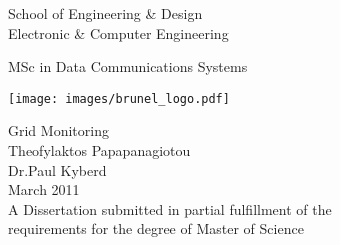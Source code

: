 
\thispagestyle{empty}

\begin{center}
\Large
School of Engineering \& Design\\
Electronic \& Computer Engineering\\
\vspace{1\baselineskip}

MSc in Data Communications Systems\\
\vspace{1\baselineskip}

\begin{center}
\texttt{[image: images/brunel\_logo.pdf]}\\
\end{center}
\vspace{0.5\baselineskip}

\Huge
Grid Monitoring\\
\vspace{1.5\baselineskip}
\Huge
Theofylaktos Papapanagiotou\\
Dr.Paul Kyberd\\
\vspace{1\baselineskip}
\large
March 2011\\
\vspace{0.5\baselineskip}
\large
A Dissertation submitted in partial fulfillment of the\\
requirements for the degree of Master of Science
\end{center}